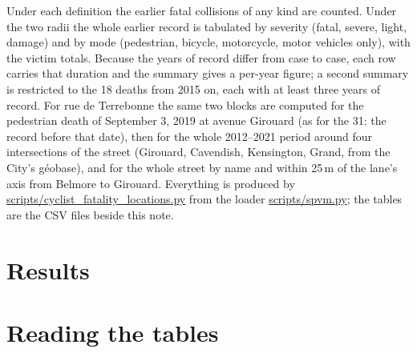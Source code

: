 \documentclass[11pt,letterpaper]{article}
\newcommand{\repourl}{https://github.com/OpenMobilityData/Montreal-collisions}
\newcommand{\doc}[2]{\href{\repourl/blob/main/#1}{#2}}
\begin{document}
Under each definition the earlier fatal collisions of any kind are counted. Under the two radii the whole earlier record is tabulated by severity (fatal, severe, light, damage) and by mode (pedestrian, bicycle, motorcycle, motor vehicles only), with the victim totals. Because the years of record differ from case to case, each row carries that duration and the summary gives a per-year figure; a second summary is restricted to the 18 deaths from 2015 on, each with at least three years of record. For rue de Terrebonne the same two blocks are computed for the pedestrian death of September 3, 2019 at avenue Girouard (as for the 31: the record before that date), then for the whole 2012--2021 period around four intersections of the street (Girouard, Cavendish, Kensington, Grand, from the City's géobase), and for the whole street by name and within 25\,m of the lane's axis from Belmore to Girouard. Everything is produced by \doc{scripts/cyclist\_fatality\_locations.py}{scripts/cyclist\_fatality\_locations.py} from the loader \doc{scripts/spvm.py}{scripts/spvm.py}; the tables are the CSV files beside this note.

\section{Results}




\section{Reading the tables}
\end{document}
